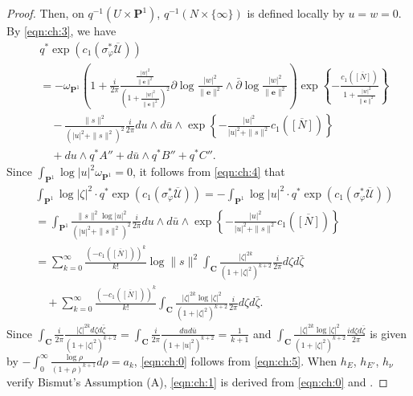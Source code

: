 \documentclass[amscd, leqno]{amsart}
\theoremstyle{plain}
\theoremstyle{definition}
\theoremstyle{remark}
\newenvironment{pf}{\begin{proof}}{\end{proof}}
\begin{document}
\begin{pf}
Then, on $q^{-1}(U \times {\mathbf P}^{1})$, $q^{-1}(N \times \{\infty\})$ is defined locally by $u=w=0$.
By \eqref{eqn:ch:3}, we have
\begin{equation}
\label{eqn:ch:4}
\begin{aligned}
\,&
q^{*}\exp( c_{1}( \sigma_{\varphi}^{*}\overline{\mathscr U} ))
\\
&=
-\omega_{{\mathbf P}^{1}} 
\left( 1 + \frac{i}{2\pi} \frac{\frac{|w|^{2}}{\|{\mathbf e} \|^{2}}}{( 1 + \frac{|w|^{2}}{\|{\mathbf e} \|^{2}} )^{2}} 
\partial \log \frac{|w|^{2}}{\| {\mathbf e}\|^{2}} {\scriptstyle \wedge} \bar{\partial} \log \frac{|w|^{2}}{\| {\mathbf e} \|^{2}}  \right)
\exp\left\{ - \frac{c_{1}(\overline{[N]})}{ 1 + \frac{|w|^{2}}{\|{\mathbf e} \|^{2}} } \right\}
\\
&\quad
-
\frac{\| s \|^{2}}{ ( |u|^{2} + \| s \|^{2} )^{2} } \frac{i}{2\pi} du {\scriptstyle \wedge} d\bar{u} 
{\scriptstyle \wedge} \exp\left\{ - \frac{|u|^{2}}{ |u|^{2} + \| s \|^{2}} c_{1}(\overline{[N]}) \right\}
\\
&\quad
+ du {\scriptstyle \wedge} q^{*}A'' + d\bar{u} {\scriptstyle \wedge} q^{*}B'' + q^{*}C''.
\end{aligned}
\end{equation}
Since $\int_{{\mathbf P}^{1}} \log |u|^{2} \omega_{{\mathbf P}^{1}} =0$, it follows from \eqref{eqn:ch:4} that
\begin{equation}
\label{eqn:ch:5}
\begin{aligned}
\,&
\int_{{\mathbf P}^{1}} \log |\zeta|^{2} \cdot q^{*}\exp( c_{1}( \sigma_{\varphi}^{*}\overline{\mathscr U} ))
=
-\int_{{\mathbf P}^{1}} \log |u|^{2} \cdot q^{*}\exp( c_{1}( \sigma_{\varphi}^{*}\overline{\mathscr U} ))
\\
&=
\int_{{\mathbf P}^{1}} \frac{\| s \|^{2} \log |u|^{2}}{ ( |u|^{2} + \| s \|^{2} )^{2} } \frac{i}{2\pi} du {\scriptstyle \wedge} d\bar{u} 
{\scriptstyle \wedge} \exp\left\{ - \frac{|u|^{2}}{ |u|^{2} + \| s \|^{2}} c_{1}(\overline{[N]}) \right\}
\\
&=
\sum_{k=0}^{\infty} \frac{(-c_{1}(\overline{[N]}))^{k}}{k!} \log \| s \|^{2} 
\int_{\mathbf C} \frac{|\zeta|^{2k}}{(1+|\zeta|^{2})^{k+2}} \frac{i}{2\pi} d\zeta d\bar{\zeta} 
\\
&\quad
+\sum_{k=0}^{\infty} \frac{(-c_{1}(\overline{[N]}))^{k}}{k!} 
\int_{\mathbf C} \frac{|\zeta|^{2k} \log |\zeta|^{2}}{(1+|\zeta|^{2})^{k+2}}  \frac{i}{2\pi} d\zeta d\bar{\zeta}.
\end{aligned}
\end{equation}
Since 
$\int_{\mathbf C} \frac{i}{2\pi} \frac{|\zeta|^{2k} d\zeta d\bar{\zeta}}{(1+|\zeta|^{2})^{k+2}} = 
\int_{\mathbf C} \frac{i}{2\pi} \frac{du d\bar{u}}{(1+|u|^{2})^{k+2}} = \frac{1}{k+1}$ and
$\int_{\mathbf C} \frac{|\zeta|^{2k} \log |\zeta|^{2}}{(1+|\zeta|^{2})^{k+2}} \frac{i d\zeta d\bar{\zeta}}{2\pi}$ is given by
$-\int_{0}^{\infty} \frac{\log\rho}{(1+\rho)^{k+1}} d\rho =a_{k}$,
\eqref{eqn:ch:0} follows from \eqref{eqn:ch:5}.
When $h_{E}$, $h_{E'}$, $h_{\nu}$ verify Bismut's Assumption (A), \eqref{eqn:ch:1} is derived from 
\eqref{eqn:ch:0} and \cite[Rem.\,3.5, especially (3.23), Th.\,3.15, Th.\,3.17]{BGS90}.
\end{pf}
\end{document}
